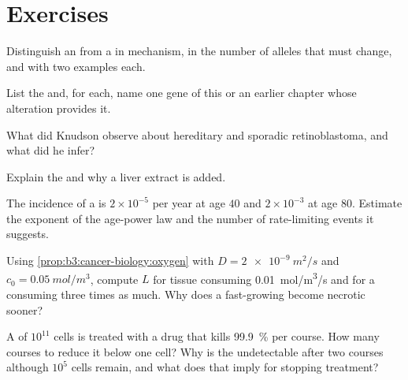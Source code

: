 \section{Exercises}

\begin{exercise}[$\star$]\label{exo:b3:cancer-biology:1}
Distinguish an  from a  in mechanism,
in the number of alleles that must change, and with two examples each.
\end{exercise}

\begin{exercise}[$\star$]\label{exo:b3:cancer-biology:2}
List the  and, for each, name one gene of this or an
earlier chapter whose alteration provides it.
\end{exercise}

\begin{exercise}[$\star$]\label{exo:b3:cancer-biology:3}
What did Knudson observe about hereditary and sporadic retinoblastoma,
and what did he infer?
\end{exercise}

\begin{exercise}[$\star$]\label{exo:b3:cancer-biology:4}
Explain the  and why a liver extract is added.
\end{exercise}

\begin{exercise}[$\star\star$]\label{exo:b3:cancer-biology:5}
The incidence of a  is $2\times 10^{-5}$ per year at age $40$
and $2\times 10^{-3}$ at age $80$. Estimate the exponent of the
age-power law and the number of rate-limiting events it suggests.
\end{exercise}

\begin{exercise}[$\star\star$]\label{exo:b3:cancer-biology:6}
Using \cref{prop:b3:cancer-biology:oxygen} with $D =
\qty{2e-9}{m^2/s}$ and $c_{0} = \qty{0.05}{mol/m^3}$, compute $L$ for
tissue consuming \qty{0.01}{mol/m^3/s} and for a  consuming three
times as much. Why does a fast-growing  become necrotic sooner?
\end{exercise}

\begin{exercise}[$\star\star$]\label{exo:b3:cancer-biology:7}
A  of $10^{11}$ cells is treated with a drug that kills
\qty{99.9}{\%} per course. How many courses to reduce it below one
cell? Why is the  undetectable after two courses although
$10^{5}$ cells remain, and what does that imply for stopping treatment?
\end{exercise}

